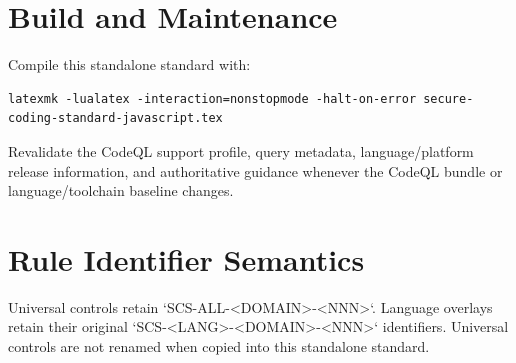 \documentclass[10pt,letterpaper]{article}
\begin{document}
\appendix
\section{Build and Maintenance}
Compile this standalone standard with:
\begin{lstlisting}
latexmk -lualatex -interaction=nonstopmode -halt-on-error secure-coding-standard-javascript.tex
\end{lstlisting}
Revalidate the CodeQL support profile, query metadata, language/platform release information, and authoritative guidance whenever the CodeQL bundle or language/toolchain baseline changes.

\section{Rule Identifier Semantics}
Universal controls retain `SCS-ALL-<DOMAIN>-<NNN>`. Language overlays retain their original `SCS-<LANG>-<DOMAIN>-<NNN>` identifiers. Universal controls are not renamed when copied into this standalone standard.
\end{document}
